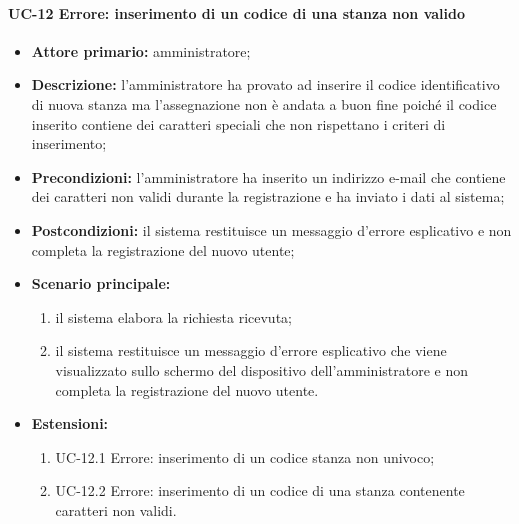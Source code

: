 \paragraph{UC-12 Errore: inserimento di un codice di una stanza non valido}
\begin{itemize}
	\item \textbf{Attore primario:} amministratore;
	\item \textbf{Descrizione:} l'amministratore ha provato ad inserire il codice identificativo di nuova stanza ma l'assegnazione non è andata a buon fine poiché il codice inserito contiene dei caratteri speciali che non rispettano i criteri di inserimento;
	\item \textbf{Precondizioni:} l'amministratore ha inserito un indirizzo e-mail che contiene dei caratteri non validi durante la registrazione e ha inviato i dati al sistema;
	\item \textbf{Postcondizioni:} il sistema restituisce un messaggio d'errore esplicativo e non completa la registrazione del nuovo utente;
	\item \textbf{Scenario principale:}
	      \begin{enumerate}
		      \item il sistema elabora la richiesta ricevuta;
		      \item il sistema restituisce un messaggio d'errore esplicativo che viene visualizzato sullo schermo del dispositivo dell'amministratore e non completa la registrazione del nuovo utente.
	      \end{enumerate}
	 \item \textbf{Estensioni:}
	 	\begin{enumerate}
		       \item UC-12.1 Errore: inserimento di un codice stanza non univoco;
		       \item UC-12.2 Errore: inserimento di un codice di una stanza contenente caratteri non validi.
	        \end{enumerate}
\end{itemize}

